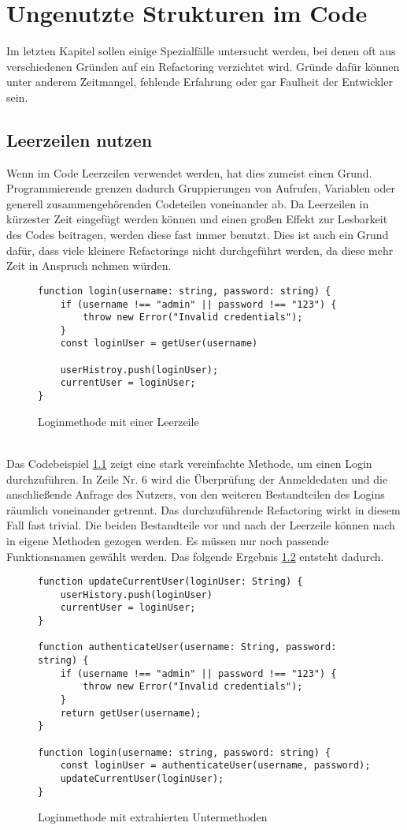 \chapter{Ungenutzte Strukturen im Code}
Im letzten Kapitel sollen einige Spezialfälle untersucht werden, bei denen oft aus verschiedenen Gründen auf ein Refactoring verzichtet wird.
Gründe dafür können unter anderem Zeitmangel, fehlende Erfahrung oder gar Faulheit der Entwickler sein.

\section{Leerzeilen nutzen}
Wenn im Code Leerzeilen verwendet werden, hat dies zumeist einen Grund. 
Programmierende grenzen dadurch Gruppierungen von Aufrufen, Variablen oder generell zusammengehörenden Codeteilen voneinander ab.
Da Leerzeilen in kürzester Zeit eingefügt werden können und einen großen Effekt zur Lesbarkeit des Codes beitragen, werden diese fast immer benutzt.
Dies ist auch ein Grund dafür, dass viele kleinere Refactorings nicht durchgeführt werden, da diese mehr Zeit in Anspruch nehmen würden. \citep[S. 325]{fiveLines.2023}
\begin{figure}[ht]
    \centering
        \begin{verbatim}
function login(username: string, password: string) {
    if (username !== "admin" || password !== "123") {
        throw new Error("Invalid credentials");
    }
    const loginUser = getUser(username)

    userHistroy.push(loginUser);
    currentUser = loginUser;
}
        \end{verbatim}
    \caption{Loginmethode mit einer Leerzeile}
    \label{fig:LoginLeerzeile}
\end{figure}\\
Das Codebeispiel \ref{fig:LoginLeerzeile} zeigt eine stark vereinfachte Methode, um einen Login durchzuführen.
In Zeile Nr. 6 wird die Überprüfung der Anmeldedaten und die anschließende Anfrage des Nutzers, von den weiteren Bestandteilen des Logins räumlich voneinander getrennt.
Das durchzuführende Refactoring wirkt in diesem Fall fast trivial.
Die beiden Bestandteile vor und nach der Leerzeile können nach \citep[S. 325]{fiveLines.2023} in eigene Methoden gezogen werden.
Es müssen nur noch passende Funktionsnamen gewählt werden.
Das folgende Ergebnis \ref{fig:LoginErgebnis} entsteht dadurch.
\begin{figure}[ht]
    \centering
        \begin{verbatim}
function updateCurrentUser(loginUser: String) {
    userHistory.push(loginUser)
    currentUser = loginUser;
}

function authenticateUser(username: String, password: string) {
    if (username !== "admin" || password !== "123") {
        throw new Error("Invalid credentials");
    }
    return getUser(username);
}

function login(username: string, password: string) {
    const loginUser = authenticateUser(username, password);
    updateCurrentUser(loginUser);
}
        \end{verbatim}
    \caption{Loginmethode mit extrahierten Untermethoden}
    \label{fig:LoginErgebnis}
\end{figure}
